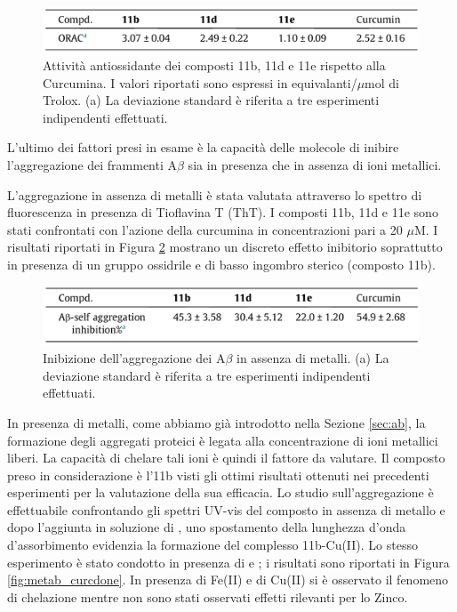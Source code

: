 \documentclass[a4paper, 12pt]{article}
\begin{document}
\begin{figure}[H]
	\centering
	\includegraphics[width=\linewidth]{immagini/roi_curcdone.png}
	\caption{Attività antiossidante dei composti 11b, 11d e 11e rispetto alla Curcumina. I valori riportati sono espressi in equivalanti/$\mu$mol di Trolox. (a) La deviazione standard è riferita a tre esperimenti indipendenti effettuati.}
	\label{fig:roi_curcdone}
\end{figure}


L'ultimo dei fattori presi in esame è la capacità delle molecole di inibire l'aggregazione dei frammenti A\(\beta\) sia in presenza che in assenza di ioni metallici.

L'aggregazione in assenza di metalli è stata valutata attraverso lo spettro di fluorescenza in presenza di Tioflavina T (ThT). I composti 11b, 11d e 11e sono stati confrontati con l'azione della curcumina in concentrazioni pari a 20 $\mu$M. I risultati riportati in Figura \ref{fig:selfab_curcdone} mostrano un discreto effetto inibitorio soprattutto in presenza di un gruppo ossidrile e di basso ingombro sterico (composto 11b).

\begin{figure}[H]
	\centering
	\includegraphics[width=\linewidth]{immagini/selfab_curcdone.png}
	\caption{Inibizione dell'aggregazione dei A\(\beta\) in assenza di metalli. (a) La deviazione standard è riferita a tre esperimenti indipendenti effettuati.}
	\label{fig:selfab_curcdone}
\end{figure}

In presenza di metalli, come abbiamo già introdotto nella Sezione \ref{sec:ab}, la formazione degli aggregati proteici è legata alla concentrazione di ioni metallici liberi. La capacità di chelare tali ioni è quindi il fattore da valutare. Il composto preso in considerazione è l'11b visti gli ottimi risultati ottenuti nei precedenti esperimenti per la valutazione della sua efficacia. Lo studio sull'aggregazione è effettuabile confrontando gli spettri UV-vis del composto in assenza di metallo e dopo l'aggiunta in soluzione di , uno spostamento della lunghezza d'onda d'assorbimento evidenzia la formazione del complesso 11b-Cu(II). Lo stesso esperimento è stato condotto in presenza di  e ; i risultati sono riportati in Figura \ref{fig:metab_curcdone}. In presenza di Fe(II) e di Cu(II) si è osservato il fenomeno di chelazione mentre non sono stati osservati effetti rilevanti per lo Zinco. \autocite{jun_yan_design_2017}
\end{document}

